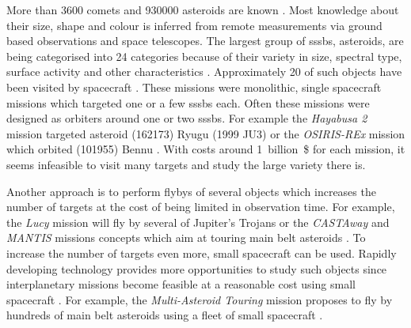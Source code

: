 More than \SI{3600}{} comets and \SI{930000}{} asteroids are known \cite{nasaSBD_count, mpc2020}. Most knowledge about their size, shape and colour is inferred from remote measurements via ground based observations and space telescopes. The largest group of \glspl{sssb}, asteroids, are being categorised into \SI{24}{} categories because of their variety in size, spectral type, surface activity and other characteristics \cite{demeo2009extension}. Approximately \SI{20}{} of such objects have been visited by spacecraft \cite{nasaSBD_missions}. These missions were monolithic, single spacecraft missions which targeted one or a few \glspl{sssb} each. Often these missions were designed as orbiters around one or two \glspl{sssb}. For example the \textit{Hayabusa 2} mission targeted asteroid (162173) Ryugu (1999 JU3) or the \textit{OSIRIS-REx} mission which orbited (101955) Bennu \cite{Watanabe2017Hayabusa2Overview, lauretta2017osiris}. With costs around 1~billion~\$ for each mission, it seems infeasible to visit many targets and study the large variety there is.

Another approach is to perform flybys of several objects which increases the number of targets at the cost of being limited in observation time. For example, the \textit{Lucy} mission will fly by several of Jupiter's Trojans \cite{stanbridge2017lucy} or the \textit{CASTAway} and \textit{MANTIS} missions concepts which aim at touring main belt asteroids \cite{bowles2018castaway, rivkin2016mainmantis}. To increase the number of targets even more, small spacecraft can be used. Rapidly developing technology provides more opportunities to study such objects since interplanetary missions become feasible at a reasonable cost using small spacecraft \cite{Poghosyan2017CubeSatMissions, andrews2019asteroid, snodgrass2019europeanCI}. For example, the \textit{Multi-Asteroid Touring} mission proposes to fly by hundreds of main belt asteroids using a fleet of small spacecraft \cite{Slavinskis2018NanospacecraftSails}.

